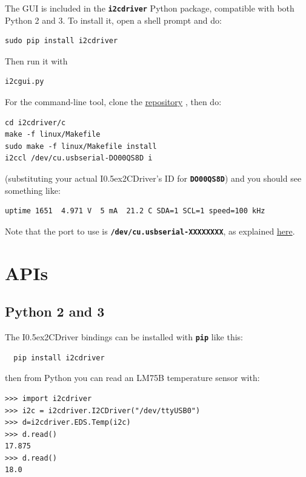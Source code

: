 \documentclass{article}
\newcommand{\two}{\raise0.5ex\hbox{\footnotesize{2}}}
\newcommand{\iicdriver}{I\two{}CDriver}
\newcommand{\mach}[1]{\texttt{\textbf{#1}}}
\begin{document}
The GUI is included in the \mach{i2cdriver} Python package, compatible with both Python 2 and 3.
To install it, open a shell prompt and do:

\begin{lstlisting}
sudo pip install i2cdriver
\end{lstlisting}

Then run it with

\begin{lstlisting}
i2cgui.py
\end{lstlisting}

For the command-line tool, clone the
\href{https://github.com/jamesbowman/i2cdriver}{repository}
, then do:

\begin{lstlisting}
cd i2cdriver/c
make -f linux/Makefile
sudo make -f linux/Makefile install
i2ccl /dev/cu.usbserial-DO00QS8D i
\end{lstlisting}

(substituting your actual \iicdriver{}'s ID for \mach{DO00QS8D})
and you should see something like:

\begin{lstlisting}
uptime 1651  4.971 V  5 mA  21.2 C SDA=1 SCL=1 speed=100 kHz
\end{lstlisting}

Note that the port to use is \mach{/dev/cu.usbserial-XXXXXXXX}, as explained
\href{https://pbxbook.com/other/mac-tty.html}{here}.

\newpage
\section{APIs}

\subsection{Python 2 and 3}

The \iicdriver{} bindings can be installed with \mach{pip} like this:

\begin{lstlisting}
  pip install i2cdriver
\end{lstlisting}

then from Python you can read an LM75B temperature sensor with:

\begin{lstlisting}
>>> import i2cdriver
>>> i2c = i2cdriver.I2CDriver("/dev/ttyUSB0")
>>> d=i2cdriver.EDS.Temp(i2c)
>>> d.read()
17.875
>>> d.read()
18.0
\end{lstlisting}
\end{document}
